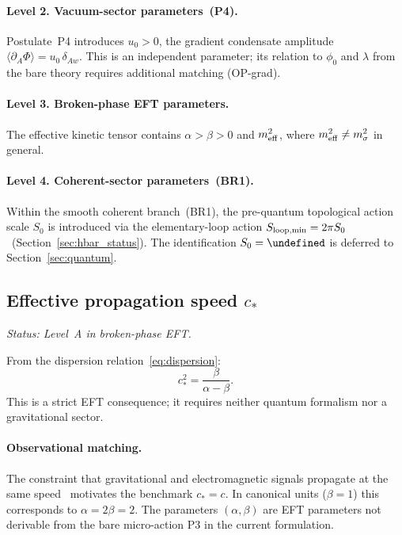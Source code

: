\documentclass[11pt,a4paper]{article}
\let\hbar\undefined
\numberwithin{equation}{section}
\begin{document}
\paragraph{Level 2. Vacuum-sector parameters~(P4).}
Postulate~P4 introduces $u_0>0$, the gradient condensate amplitude
$\langle\partial_A\Phi\rangle = u_0\,\delta_{Aw}$.
This is an independent parameter; its relation to $\phi_0$
and $\lambda$ from the bare theory requires additional
matching (OP-grad).

\paragraph{Level 3. Broken-phase EFT parameters.}
The effective kinetic tensor contains $\alpha>\beta>0$ and $m_{\rm eff}^2$,
where $m_{\rm eff}^2\neq m_\sigma^2$ in general.

\paragraph{Level 4. Coherent-sector parameters~(BR1).}
Within the smooth coherent branch~(BR1), the pre-quantum topological
action scale $S_0$ is introduced via the elementary-loop
action $S_{\rm loop,min}=2\pi S_0$~(Section~\ref{sec:hbar_status}).
The identification $S_0=\hbar$ is deferred to
Section~\ref{sec:quantum}.

\subsection{Effective propagation speed $c_*$}
\label{sec:c_star}

\textit{Status: Level~A in broken-phase EFT.}

From the dispersion relation~\eqref{eq:dispersion}:
\begin{equation}
  \label{eq:c_star_def}
  \boxed{c_*^2 = \frac{\beta}{\alpha-\beta}.}
\end{equation}
This is a strict EFT consequence; it requires neither quantum
formalism nor a gravitational sector.

\paragraph{Observational matching.}
The constraint that gravitational and electromagnetic signals propagate
at the same speed~\cite{LIGO_Virgo_GW170817_2017} motivates the
benchmark $c_*=c$. In canonical units ($\beta=1$) this corresponds
to $\alpha=2\beta=2$.
The parameters $(\alpha,\beta)$ are EFT parameters not derivable
from the bare micro-action P3 in the current formulation.
\end{document}
